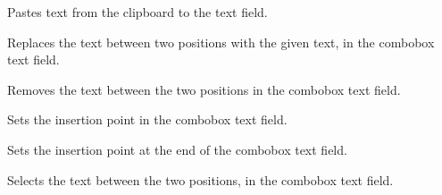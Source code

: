 
Pastes text from the clipboard to the text field.

\label{wxcomboboxreplace}


Replaces the text between two positions with the given text, in the combobox text field.





\label{wxcomboboxremove}


Removes the text between the two positions in the combobox text field.




\label{wxcomboboxsetinsertionpoint}


Sets the insertion point in the combobox text field.



\label{wxcomboboxsetinsertionpointend}


Sets the insertion point at the end of the combobox text field.

\label{wxcomboboxsetselection}


Selects the text between the two positions, in the combobox text field.




